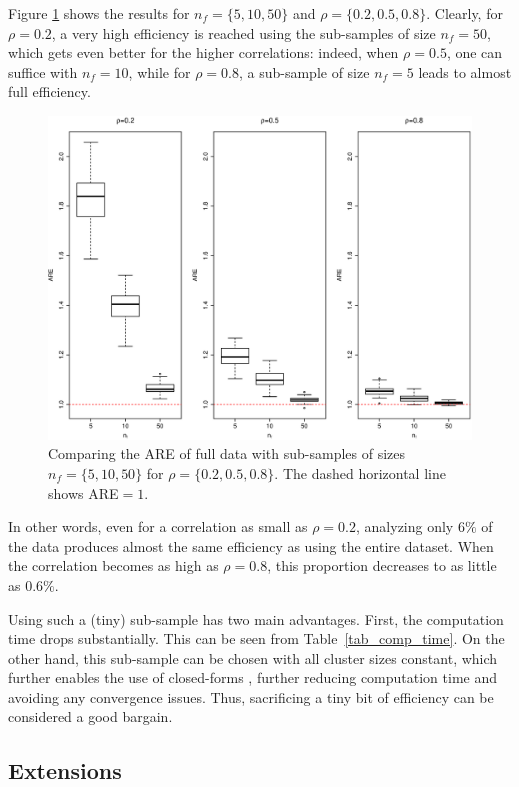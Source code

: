 \documentclass[11pt,a5paper,twoside]{book}
\begin{document}
Figure \ref{fig_m1} shows the results for $n_f=\{5,10,50\}$ and $\rho=\{0.2,0.5,0.8\}$. 
Clearly, for $\rho=0.2$, a very high efficiency is reached using the sub-samples of size $n_f=50$, which gets even better for the higher correlations: indeed, when $\rho=0.5$, one can suffice with $n_f=10$, while for $\rho=0.8$, a sub-sample of size $n_f=5$ leads to almost full efficiency.
\begin{figure}[!t]
\centering
\includegraphics[width=\textwidth]{fig_m1.eps}
\caption{Comparing the ARE of full data with sub-samples of sizes $n_f=\{5,10,50\}$ for $\rho=\{0.2,0.5,0.8\}$. The dashed horizontal line shows ARE$=1$.} 
\label{fig_m1}
\end{figure}  
In other words,  even for a correlation as small as $\rho=0.2$, analyzing only $6\%$ of the data produces almost the same efficiency as using the entire dataset. When the correlation becomes as high as $\rho=0.8$, this proportion decreases to as little as $0.6\%$. 

Using such a (tiny) sub-sample has two main advantages. First, the computation time drops substantially. This can be seen from Table~\ref{tab_comp_time}. On the other hand, this  sub-sample can be chosen with all cluster sizes constant, which further enables the use of closed-forms \cite{Lisa2015_2}, further reducing computation time and avoiding any convergence issues. Thus, sacrificing a tiny bit of efficiency can be considered a good bargain. 

\subsection{Extensions}
\label{sec_detect}
\end{document}
